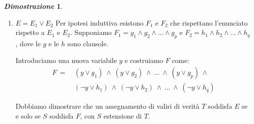 \documentclass[12pt]{article}
\theoremstyle{definition}
\newtheorem*{myproof}{\em Dimostrazione}
\begin{document}
\begin{myproof}
\begin{description}
\begin{enumerate}
\begin{enumerate}
            \item Se \(S\) soddisfa \(F\), allora esiste \(T\) che soddisfa \(E\), con \(S\) estensione di \(T\):\newline
              Sia \(S\) un assegnamento di valori di verit\`a che soddisfa \(F\). Siano\(S_1\) e \(S_2\) le restrizioni di \(S\) rispettivamente
              su \(F_1\) e \(F_2\).\newline
              Per ipotesi induttiva esistono \(T_1\) e \(T_2\) che soddisfano rispettivamente \(E_1\) e \(E_2\), con \(S_1\) estensione di \(T_1\)
              e \(S_2\) estensione di \(T_2\).\newline
              Poich\`e \(F\) \`e l'AND di \(F_1\) e \(F_2\), allora \(S_1\) e \(S_2\) hanno variabili concordi. Allora anche \(T_1\) e \(T_2\) hanno
              variabili comuni concordi.\newline
              Possiamo allora costruire \(T\) in accordo a \(T_1\) e \(T_2\).\newline
              Essendo \(E\) l'AND di \(E_1\) e \(E_2\), \(T\) soddisfa \(E\).\newline

          \end{enumerate}

        \item \(E = E_1 \lor E_2\) Per ipotesi induttiva esistono \(F_1\) e \(F_2\) che rispettano l'enunciato rispetto a \(E_1\) e \(E_2\).
          Supponiamo \(F_1 = g_1 \land g_2 \land \ldots \land g_p\) e \(F_2 = h_1 \land h_2 \land \ldots \land h_q\), dove le \(g\) e le \(h\) sono clausole.\newline

          Introduciamo una nuova variabile \(y\) e costruiamo \(F\) come:\[
          \begin{aligned}
          F\ =\ &(y \lor g_1)\ \land\ (y \lor g_2)\ \land\ \ldots\ \land\ (y \lor g_p)\ \land \\
          &(\lnot y \lor h_1)\ \land\ (\lnot y \lor h_2)\ \land\ \ldots\ \land\ (\lnot y \lor h_q)
          \end{aligned}
          \]

          Dobbiamo dimostrare che un assegnamento di valiri di verit\`a \(T\) soddisfa \(E\) se e solo se \(S\) soddisfa \(F\),
          con \(S\) estensione di \(T\).\newline

          \begin{enumerate}


\end{enumerate}
\end{enumerate}
\end{description}
\end{myproof}
\end{document}
